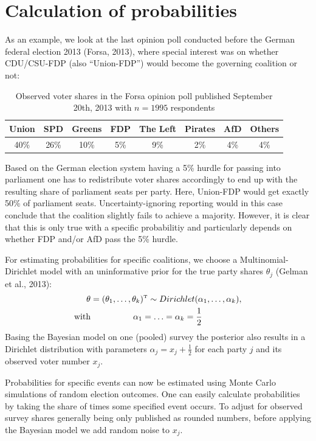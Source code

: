 \documentclass[twoside]{report}
\begin{document}
\section{Calculation of probabilities}
As an example, we look at the last opinion poll conducted before the German federal election 2013 (Forsa, 2013), where special interest was on whether CDU/CSU-FDP (also ``Union-FDP'') would become the governing coalition or not:
\begin{table}[!ht]\centering
\caption{\label{bauer:tab_fdp} Observed voter shares in the Forsa opinion poll published September 20th, 2013 with $n=1995$ respondents}
\medskip
\begin{tabular}{cccccccc}
\toprule[0.09 em]
Union & SPD & Greens & FDP & The Left & Pirates & AfD & Others \\
\midrule
40\% & 26\% & 10\% & 5\% & 9\% & 2\% & 4\% & 4\% \\
\bottomrule[0.09 em]
\end{tabular}
\end{table}
\vspace{2ex}

Based on the German election system having a 5\% hurdle for passing into parliament one has to redistribute voter shares accordingly to end up with the resulting share of parliament seats per party. Here, Union-FDP would get exactly 50\% of parliament seats. Uncertainty-ignoring reporting would in this case conclude that the coalition slightly fails to achieve a majority. However, it is clear that this is only true with a specific probabilitiy and particularly depends on whether FDP and/or AfD pass the 5\% hurdle.


For estimating probabilities for specific coalitions, we choose a Multinomial-Dirichlet model with an uninformative prior for the true party shares $\theta_j$ (Gelman et al., 2013):
$$
\begin{aligned}
\boldmath{\theta} &= (\theta_1,\ldots,\theta_k)^{ \mathrm{\scriptscriptstyle T} } \sim Dirichlet(\alpha_1,\ldots,\alpha_k), \\
\text{with} &\ \ \ \ \ \ \ \ \ \ \ \ \ \ \ \alpha_1 = \ldots = \alpha_k = \frac{1}{2}
\end{aligned}
$$
Basing the Bayesian model on one (pooled) survey the posterior also results in a Dirichlet distribution with parameters $\alpha_j = x_j + \frac{1}{2}$ for each party $j$ and its observed voter number $x_j$.

Probabilities for specific events can now be estimated using Monte Carlo simulations of random election outcomes. One can easily calculate probabilities by taking the share of times some specified event occurs. To adjust for observed survey shares generally being only published as rounded numbers, before applying the Bayesian model
we add random noise to $x_j$.
\end{document}
